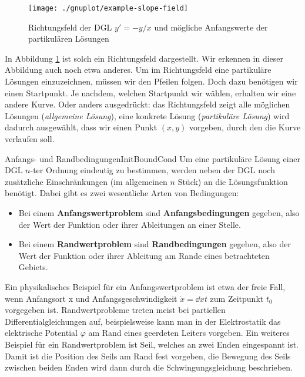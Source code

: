 \begin{figure}
    \centering
    \texttt{[image: ./gnuplot/example-slope-field]}
    \caption[Richtungsfeld einer DGL]{Richtungsfeld der DGL $y'=-y/x$ und mögliche Anfangswerte der partikulären Lösungen}
    \label{fig:ExSlopField}
\end{figure}

In Abbildung \ref{fig:ExSlopField} ist solch ein Richtungsfeld dargestellt. Wir erkennen in dieser Abbildung auch noch etwa anderes. Um im Richtungsfeld eine partikuläre Lösungen einzuzeichnen, müssen wir den Pfeilen folgen. Doch dazu benötigen wir einen Startpunkt. Je nachdem, welchen Startpunkt wir wählen, erhalten wir eine andere Kurve. Oder anders ausgedrückt: das Richtungsfeld zeigt alle möglichen Lösungen (\emph{allgemeine Lösung}), eine konkrete Lösung (\emph{partikuläre Lösung}) wird dadurch ausgewählt, dass wir einen Punkt $(x,y)$ vorgeben, durch den die Kurve verlaufen soll.

\begin{definition}{Anfangs- und Randbedingungen}{InitBoundCond}
    Um eine partikuläre Lösung einer DGL $n$-ter Ordnung eindeutig zu bestimmen, werden neben der DGL noch zusätzliche Einschränkungen (im allgemeinen $n$ Stück) an die Lösungsfunktion benötigt. Dabei gibt es zwei wesentliche Arten von Bedingungen:
    \begin{itemize}
        \item Bei einem \textbf{Anfangswertproblem} sind \textbf{Anfangsbedingungen} gegeben, also der Wert der Funktion oder ihrer Ableitungen an einer Stelle.
        \item Bei einem \textbf{Randwertproblem} sind \textbf{Randbedingungen} gegeben, also der Wert der Funktion oder ihrer Ableitung am Rande eines betrachteten Gebiets.
    \end{itemize}
\end{definition}

Ein physikalisches Beispiel für ein Anfangswertproblem ist etwa der freie Fall, wenn Anfangsort x und Anfangsgeschwindigkeit $\dot{x} = \dd{x}{t}$ zum Zeitpunkt $t_0$ vorgegeben ist. Randwertprobleme treten meist bei partiellen Differentialgleichungen auf, beispielsweise kann man in der Elektrostatik das elektrische Potential $\varphi$ am Rand eines geerdeten Leiters vorgeben. Ein weiteres Beispiel für ein Randwertproblem ist Seil, welches an zwei Enden eingespannt ist. Damit ist die Position des Seils am Rand fest vorgeben, die Bewegung des Seils zwischen beiden Enden wird dann durch die Schwingungsgleichung beschrieben.

